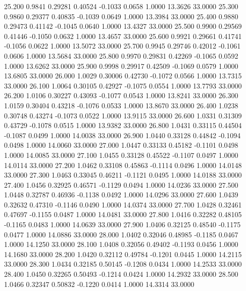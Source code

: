   25.200   0.9841   0.29281   0.40524  -0.1033   0.0658   1.0000  13.3626  33.0000
  25.300   0.9860   0.29377   0.40835  -0.1039   0.0649   1.0000  13.3984  33.0000
  25.400   0.9880   0.29473   0.41142  -0.1045   0.0640   1.0000  13.4327  33.0000
  25.500   0.9900   0.29569   0.41446  -0.1050   0.0632   1.0000  13.4657  33.0000
  25.600   0.9921   0.29661   0.41741  -0.1056   0.0622   1.0000  13.5072  33.0000
  25.700   0.9945   0.29746   0.42012  -0.1061   0.0606   1.0000  13.5684  33.0000
  25.800   0.9970   0.29831   0.42269  -0.1065   0.0592   1.0000  13.6262  33.0000
  25.900   0.9998   0.29917   0.42509  -0.1069   0.0579   1.0000  13.6805  33.0000
  26.000   1.0029   0.30006   0.42730  -0.1072   0.0566   1.0000  13.7315  33.0000
  26.100   1.0064   0.30105   0.42927  -0.1075   0.0554   1.0000  13.7793  33.0000
  26.200   1.0106   0.30227   0.43093  -0.1077   0.0543   1.0000  13.8241  33.0000
  26.300   1.0159   0.30404   0.43218  -0.1076   0.0533   1.0000  13.8670  33.0000
  26.400   1.0238   0.30748   0.43274  -0.1073   0.0522   1.0000  13.9115  33.0000
  26.600   1.0331   0.31309   0.43729  -0.1078   0.0515   1.0000  13.9382  33.0000
  26.800   1.0431   0.33115   0.44504  -0.1087   0.0499   1.0000  14.0038  33.0000
  26.900   1.0440   0.33128   0.44842  -0.1094   0.0498   1.0000  14.0060  33.0000
  27.000   1.0447   0.33133   0.45182  -0.1101   0.0498   1.0000  14.0085  33.0000
  27.100   1.0455   0.33128   0.45522  -0.1107   0.0497   1.0000  14.0114  33.0000
  27.200   1.0462   0.33108   0.45863  -0.1114   0.0496   1.0000  14.0148  33.0000
  27.300   1.0463   0.33045   0.46211  -0.1121   0.0495   1.0000  14.0188  33.0000
  27.400   1.0456   0.32925   0.46571  -0.1129   0.0494   1.0000  14.0236  33.0000
  27.500   1.0448   0.32787   0.46936  -0.1138   0.0492   1.0000  14.0296  33.0000
  27.600   1.0439   0.32632   0.47310  -0.1146   0.0490   1.0000  14.0374  33.0000
  27.700   1.0428   0.32461   0.47697  -0.1155   0.0487   1.0000  14.0481  33.0000
  27.800   1.0416   0.32282   0.48105  -0.1165   0.0483   1.0000  14.0639  33.0000
  27.900   1.0406   0.32125   0.48540  -0.1175   0.0477   1.0000  14.0886  33.0000
  28.000   1.0402   0.32046   0.48985  -0.1185   0.0467   1.0000  14.1250  33.0000
  28.100   1.0408   0.32056   0.49402  -0.1193   0.0456   1.0000  14.1680  33.0000
  28.200   1.0420   0.32112   0.49784  -0.1201   0.0445   1.0000  14.2115  33.0000
  28.300   1.0434   0.32185   0.50145  -0.1208   0.0434   1.0000  14.2533  33.0000
  28.400   1.0450   0.32265   0.50493  -0.1214   0.0424   1.0000  14.2932  33.0000
  28.500   1.0466   0.32347   0.50832  -0.1220   0.0414   1.0000  14.3314  33.0000

